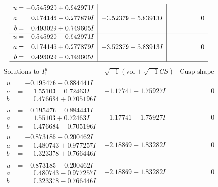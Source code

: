 \documentclass[1p]{elsarticle_modified}
\theoremstyle{definition}
\newcommand{\I}{\sqrt{-1}}
\begin{document}
$$\begin{array}{c|c|c}
\begin{aligned}
u &= -0.545920 + 0.942971 I \\
a &= \phantom{-}0.174146 - 0.277879 I \\
b &= \phantom{-}0.493029 + 0.749605 I\end{aligned}
 & -3.52379 + 5.83913 I & \phantom{-0.000000 } 0 \\ \hline\begin{aligned}
u &= -0.545920 - 0.942971 I \\
a &= \phantom{-}0.174146 + 0.277879 I \\
b &= \phantom{-}0.493029 - 0.749605 I\end{aligned}
 & -3.52379 - 5.83913 I & \phantom{-0.000000 } 0\\
 \hline 
 \end{array}$$\newpage$$\begin{array}{c|c|c}  
\text{Solutions to }I^u_{1}& \I (\text{vol} + \sqrt{-1}CS) & \text{Cusp shape}\\
 \hline 
\begin{aligned}
u &= -0.195476 + 0.884441 I \\
a &= \phantom{-}1.55103 - 0.72463 I \\
b &= \phantom{-}0.476684 + 0.705196 I\end{aligned}
 & -1.17741 - 1.75927 I & \phantom{-0.000000 } 0 \\ \hline\begin{aligned}
u &= -0.195476 - 0.884441 I \\
a &= \phantom{-}1.55103 + 0.72463 I \\
b &= \phantom{-}0.476684 - 0.705196 I\end{aligned}
 & -1.17741 + 1.75927 I & \phantom{-0.000000 } 0 \\ \hline\begin{aligned}
u &= -0.873185 + 0.200462 I \\
a &= \phantom{-}0.480743 + 0.977257 I \\
b &= \phantom{-}0.323378 + 0.766446 I\end{aligned}
 & -2.18869 - 1.83282 I & \phantom{-0.000000 } 0 \\ \hline\begin{aligned}
u &= -0.873185 - 0.200462 I \\
a &= \phantom{-}0.480743 - 0.977257 I \\
b &= \phantom{-}0.323378 - 0.766446 I\end{aligned}
 & -2.18869 + 1.83282 I & \phantom{-0.000000 } 0 \\ \hline\begin{aligned}

\end{aligned}
\end{array}$$
\end{document}

